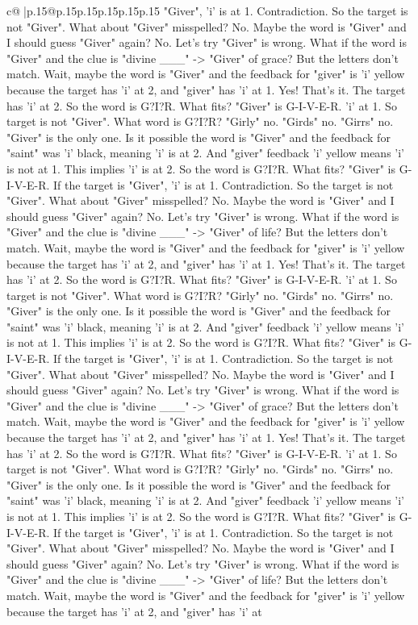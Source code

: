 \documentclass{article}
\begin{document}
{\begin{supertabular}{c@{$\;$}|p{.15\linewidth}@{}p{.15\linewidth}p{.15\linewidth}p{.15\linewidth}p{.15\linewidth}p{.15\linewidth}}
{{{"Giver", 'i' is at 1. Contradiction. So the target is not "Giver". What about "Giver" misspelled? No. Maybe the word is "Giver" and I should guess "Giver" again? No. Let's try "Giver" is wrong. What if the word is "Giver" and the clue is "divine \_\_\_" {-}> "Giver" of grace? But the letters don't match. Wait, maybe the word is "Giver" and the feedback for "giver" is 'i' yellow because the target has 'i' at 2, and "giver" has 'i' at 1. Yes! That's it. The target has 'i' at 2. So the word is G?I?R. What fits? "Giver" is G{-}I{-}V{-}E{-}R. 'i' at 1. So target is not "Giver". What word is G?I?R? "Girly" no. "Girds" no. "Girrs" no. "Giver" is the only one. Is it possible the word is "Giver" and the feedback for "saint" was 'i' black, meaning 'i' is at 2. And "giver" feedback 'i' yellow means 'i' is not at 1. This implies 'i' is at 2. So the word is G?I?R. What fits? "Giver" is G{-}I{-}V{-}E{-}R. If the target is "Giver", 'i' is at 1. Contradiction. So the target is not "Giver". What about "Giver" misspelled? No. Maybe the word is "Giver" and I should guess "Giver" again? No. Let's try "Giver" is wrong. What if the word is "Giver" and the clue is "divine \_\_\_" {-}> "Giver" of life? But the letters don't match. Wait, maybe the word is "Giver" and the feedback for "giver" is 'i' yellow because the target has 'i' at 2, and "giver" has 'i' at 1. Yes! That's it. The target has 'i' at 2. So the word is G?I?R. What fits? "Giver" is G{-}I{-}V{-}E{-}R. 'i' at 1. So target is not "Giver". What word is G?I?R? "Girly" no. "Girds" no. "Girrs" no. "Giver" is the only one. Is it possible the word is "Giver" and the feedback for "saint" was 'i' black, meaning 'i' is at 2. And "giver" feedback 'i' yellow means 'i' is not at 1. This implies 'i' is at 2. So the word is G?I?R. What fits? "Giver" is G{-}I{-}V{-}E{-}R. If the target is "Giver", 'i' is at 1. Contradiction. So the target is not "Giver". What about "Giver" misspelled? No. Maybe the word is "Giver" and I should guess "Giver" again? No. Let's try "Giver" is wrong. What if the word is "Giver" and the clue is "divine \_\_\_" {-}> "Giver" of grace? But the letters don't match. Wait, maybe the word is "Giver" and the feedback for "giver" is 'i' yellow because the target has 'i' at 2, and "giver" has 'i' at 1. Yes! That's it. The target has 'i' at 2. So the word is G?I?R. What fits? "Giver" is G{-}I{-}V{-}E{-}R. 'i' at 1. So target is not "Giver". What word is G?I?R? "Girly" no. "Girds" no. "Girrs" no. "Giver" is the only one. Is it possible the word is "Giver" and the feedback for "saint" was 'i' black, meaning 'i' is at 2. And "giver" feedback 'i' yellow means 'i' is not at 1. This implies 'i' is at 2. So the word is G?I?R. What fits? "Giver" is G{-}I{-}V{-}E{-}R. If the target is "Giver", 'i' is at 1. Contradiction. So the target is not "Giver". What about "Giver" misspelled? No. Maybe the word is "Giver" and I should guess "Giver" again? No. Let's try "Giver" is wrong. What if the word is "Giver" and the clue is "divine \_\_\_" {-}> "Giver" of life? But the letters don't match. Wait, maybe the word is "Giver" and the feedback for "giver" is 'i' yellow because the target has 'i' at 2, and "giver" has 'i' at }}}
\end{supertabular}}
\end{document}
